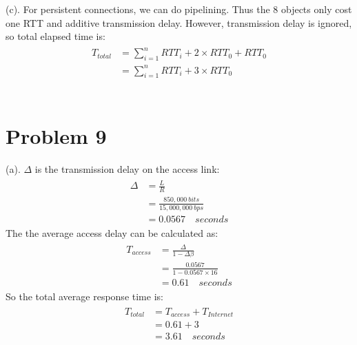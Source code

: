 \documentclass[titlepage, paper=a4, fontsize=11pt]{scrartcl} %
\numberwithin{equation}{section} %
\numberwithin{figure}{section} %
\numberwithin{table}{section} %
\begin{document}
(c). For persistent connections, we can do pipelining. Thus the 8 objects only cost one RTT and additive
transmission delay. However, transmission delay is ignored, so total elapsed time is:
\begin{align*} 
\begin{split}
T_{total} &= \sum\limits_{i=1}^n RTT_{i} + 2 \times RTT_{0} + RTT_{0} \\
&= \sum\limits_{i=1}^n RTT_{i} + 3 \times RTT_{0}
\end{split}					
\end{align*}
\\



\section*{Problem 9}
(a). $\Delta$ is the transmission delay on the access link:
\begin{align*} 
\begin{split}
\Delta &= \frac{L}{R} \\
&= \frac{850,000 \  bits}{15,000,000 \  bps} \\
&= 0.0567 \quad seconds
\end{split}					
\end{align*}
The the average access delay can be calculated as:
\begin{align*} 
\begin{split}
T_{access} &= \frac{\Delta}{1-\Delta\beta} \\
&= \frac{0.0567}{1-0.0567 \times 16} \\
&= 0.61 \quad seconds
\end{split}					
\end{align*}
So the total average response time is:
\begin{align*} 
\begin{split}
T_{total} &= T_{access} + T_{Internet} \\
&= 0.61 + 3 \\
&= 3.61 \quad seconds
\end{split}					
\end{align*}
\end{document}
